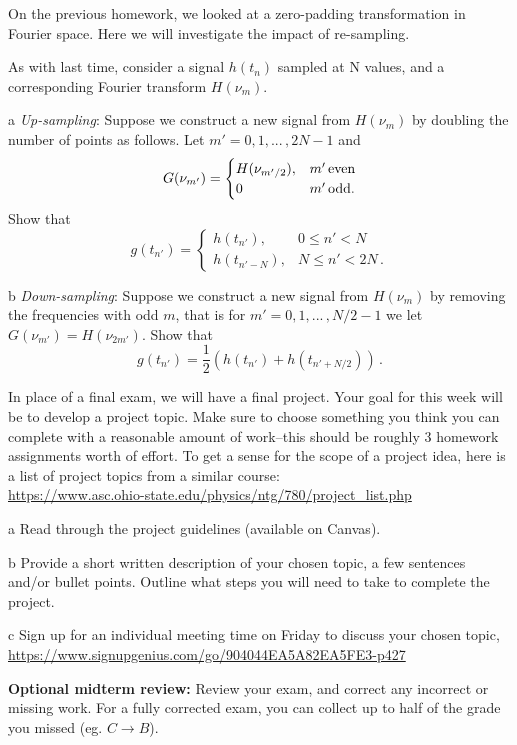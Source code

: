\documentclass[]{homework}
\begin{document}

\begin{problem}{1}
  On the previous homework, we looked at a zero-padding transformation in Fourier space.
  Here we will investigate the impact of re-sampling.


  As with last time, consider a signal $h(t_n)$ sampled at N values, and a corresponding Fourier transform $H(\nu_m)$.
  \begin{subproblem}{a}
    {\em Up-sampling}: Suppose we construct a new signal from $H(\nu_m)$ by doubling the number of points as follows.
    Let $m' = 0, 1, ...\,, 2N-1$ and
    \[
      G(\nu_{m'}) = \begin{cases} 
      H(\nu_{m'/2}), & m'\,{\rm even} \\
      0 & m'\,{\rm odd}.
      \end{cases}
    \]
    Show that
    \[
      g(t_{n'}) = \begin{cases} 
      h(t_{n'}), & 0 \le n' < N \\
      h(t_{n'-N}), & N \le n' < 2N\,.
   \end{cases}
    \]
  \end{subproblem}
  \begin{subproblem}{b}
    {\em Down-sampling}: Suppose we construct a new signal from $H(\nu_m)$ by removing the frequencies with odd $m$,
    that is for $m' = 0, 1, ...\,, N/2-1$ we let $G(\nu_{m'}) = H(\nu_{2m'})$. Show that
    \[
      g(t_{n'}) = \frac{1}{2}\left( h(t_{n'}) + h(t_{n'+N/2}) \right)\,.
    \]
  \end{subproblem}
\end{problem}

\begin{problem}{2}
  In place of a final exam, we will have a final project.
  Your goal for this week will be to develop a project topic.
  Make sure to choose something you think you can complete with a reasonable
  amount of work--this should be roughly 3 homework assignments worth of effort.
  To get a sense for the scope of a project idea, here is a list of project
  topics from a similar course:\\
  \url{https://www.asc.ohio-state.edu/physics/ntg/780/project_list.php}

  \begin{subproblem}{a}
    Read through the project guidelines (available on Canvas).
  \end{subproblem}
  \begin{subproblem}{b}
    Provide a short written description of your chosen topic, a few sentences and/or bullet points.
    Outline what steps you will need to take to complete the project.
  \end{subproblem}
  \begin{subproblem}{c}
      Sign up for an individual meeting time on Friday to discuss your chosen topic,\\
      \url{https://www.signupgenius.com/go/904044EA5A82EA5FE3-p427}
  \end{subproblem}
\end{problem}

\vspace{1cm}

{\bf Optional midterm review:} Review your exam, and correct any incorrect or missing work.
For a fully corrected exam, you can collect up to half of the grade you missed (eg. $C \rightarrow B$).
\end{document}
